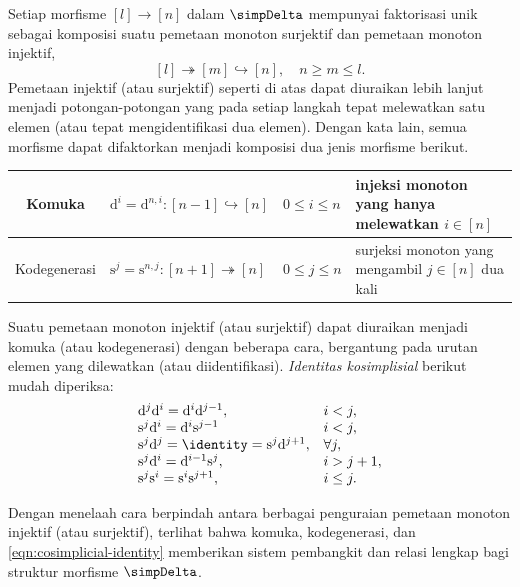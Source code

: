 Setiap morfisme $[l]\to[n]$ dalam $\simpDelta$ mempunyai faktorisasi unik
sebagai komposisi suatu pemetaan monoton surjektif dan pemetaan monoton
injektif,
\[ [l] \twoheadrightarrow [m] \hookrightarrow [n], \quad n \geq m \leq l. \]
Pemetaan injektif (atau surjektif) seperti di atas dapat diuraikan lebih lanjut
menjadi potongan-potongan yang pada setiap langkah tepat melewatkan satu
elemen (atau tepat mengidentifikasi dua elemen). Dengan kata lain, semua
morfisme dapat difaktorkan menjadi komposisi dua jenis morfisme berikut.
\begin{center}\begin{tabular}{|c|l|l|l|} \hline
	Komuka & $\mathrm{d}^i = \mathrm{d}^{n, i}: [n-1] \hookrightarrow [n]$ & $0 \leq i \leq n$ & injeksi monoton yang hanya melewatkan $i\in[n]$ \\ \hline
	Kodegenerasi & $\mathrm{s}^j = \mathrm{s}^{n, j}: [n+1] \twoheadrightarrow [n]$ & $0 \leq j \leq n$ & surjeksi monoton yang mengambil $j\in[n]$ dua kali \\ \hline
\end{tabular}\end{center}

Suatu pemetaan monoton injektif (atau surjektif) dapat diuraikan menjadi
komuka (atau kodegenerasi) dengan beberapa cara, bergantung pada urutan
elemen yang dilewatkan (atau diidentifikasi). \emph{Identitas kosimplisial}
berikut mudah diperiksa:
\begin{equation}\label{eqn:cosimplicial-identity}\begin{array}{ll}
	\mathrm{d}^j \mathrm{d}^i = \mathrm{d}^i \mathrm{d}^{j-1}, & i < j, \\
	\mathrm{s}^j \mathrm{d}^i = \mathrm{d}^i \mathrm{s}^{j-1} & i < j, \\
	\mathrm{s}^j \mathrm{d}^j = \identity = \mathrm{s}^j \mathrm{d}^{j+1}, & \forall j, \\
	\mathrm{s}^j \mathrm{d}^i = \mathrm{d}^{i-1} \mathrm{s}^j, & i > j+1, \\
	\mathrm{s}^j \mathrm{s}^i = \mathrm{s}^i \mathrm{s}^{j+1}, & i \leq j.
\end{array}\end{equation}

Dengan menelaah cara berpindah antara berbagai penguraian
pemetaan monoton injektif (atau surjektif), terlihat bahwa komuka,
kodegenerasi, dan \eqref{eqn:cosimplicial-identity} memberikan sistem
pembangkit dan relasi lengkap bagi struktur morfisme $\simpDelta$.

